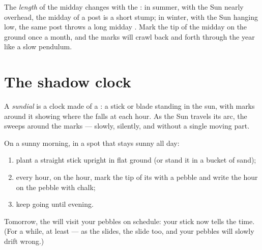 \begin{example}\label{ex:g3:sun-days-seasons:shadowlength}
The \emph{length} of the midday  changes with the : in
summer, with the Sun nearly overhead, the midday  of a post is
a short stump; in winter, with the Sun hanging low, the same post
throws a long midday . Mark the tip of the midday  on
the ground once a month, and the marks will crawl back and forth
through the year like a slow pendulum.
\end{example}

\section{The shadow clock}

\begin{definition}[Sundial]\label{def:g3:sun-days-seasons:sundial}
A \emph{sundial} is a clock made of a : a stick
or blade standing in the sun, with marks around it showing where the
 falls at each hour. As the Sun travels its arc, the 
sweeps around the marks --- slowly, silently, and without a single
moving part.
\end{definition}

\begin{method}\label{met:g3:sun-days-seasons:build}
On a sunny morning, in a spot that stays sunny all day:
\begin{enumerate}
  \item plant a straight stick upright in flat ground (or stand it
        in a bucket of sand);
  \item every hour, on the hour, mark the tip of its  with a
        pebble and write the hour on the pebble with chalk;
  \item keep going until evening.
\end{enumerate}
Tomorrow, the  will visit your pebbles on schedule: your stick
now tells the time. (For a while, at least --- as the  slides,
the  slide too, and your pebbles will slowly drift wrong.)
\end{method}

